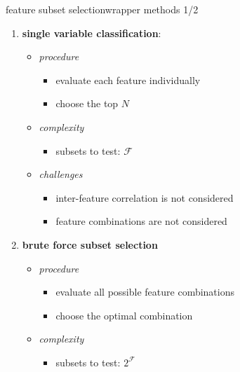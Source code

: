 		\begin{frame}{feature subset selection}{wrapper methods 1/2}
            \vspace{-2mm}
			\begin{enumerate}
				\item	\textbf{single variable classification}:
                    \begin{itemize}
                        \item   \textit{procedure}
                            \begin{itemize}
                                \item   evaluate each feature individually
                                \item   choose the top $N$
                            \end{itemize}
                        \item<1->  \textit{complexity} 
                            \begin{itemize}
                                \item   subsets to test: $\mathcal{F}$
                            \end{itemize}
                        \item<1->   \textit{challenges}
                            \begin{itemize}
                                \item	inter-feature correlation is not considered
                                \item	feature combinations are not considered
                            \end{itemize}
                    \end{itemize}
				\smallskip 
                \item<2->	\textbf{brute force subset selection}
                    \begin{itemize}
                        \item   \textit{procedure}
                            \begin{itemize}
                                \item   evaluate all possible feature combinations
                                \item   choose the optimal combination
                            \end{itemize}
                        \item<2->  \textit{complexity} 
                            \begin{itemize}
                                \item   subsets to test: $2^\mathcal{F}$
                            \end{itemize}
                    \end{itemize}
			\end{enumerate}
		\end{frame}
